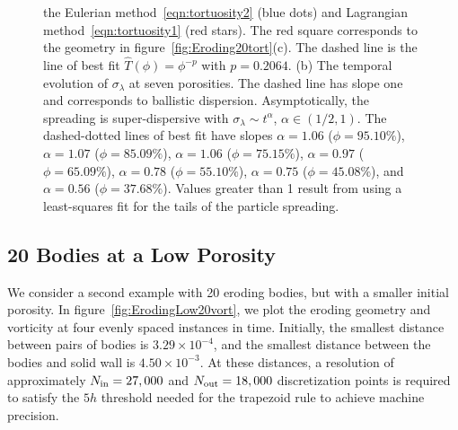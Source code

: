 \documentclass{jfm}
\begin{document}
\begin{figure}
{the Eulerian method~\eqref{eqn:tortuosity2} (blue dots) and Lagrangian
method~\eqref{eqn:tortuosity1} (red stars).  The red square corresponds
to the geometry in figure~\ref{fig:Eroding20tort}(c).  The dashed line
is the line of best fit $\widehat{T}(\phi)=\phi^{-p}$ with $p=0.2064$.
(b) The temporal evolution of $\sigma_\lambda$ at seven porosities.  The
dashed line has slope one and corresponds to ballistic dispersion.
Asymptotically, the spreading is super-dispersive with $\sigma_\lambda
\sim t^\alpha$, $\alpha \in (1/2,1)$.  The dashed-dotted lines of best
fit have slopes $\alpha = 1.06$ ($\phi=95.10\%$), $\alpha = 1.07$
($\phi=85.09\%$), $\alpha = 1.06$ ($\phi=75.15\%$), $\alpha = 0.97$
($\phi=65.09\%$), $\alpha = 0.78$ ($\phi=55.10\%$), $\alpha = 0.75$
($\phi=45.08\%$), and $\alpha = 0.56$ ($\phi=37.68\%$).  Values greater
than 1 result from using a least-squares fit for the tails of the
particle spreading.}
\end{figure}


\subsection{20 Bodies at a Low Porosity}
We consider a second example with 20 eroding bodies, but with a smaller
initial porosity.  In figure~\ref{fig:ErodingLow20vort}, we plot the
eroding geometry and vorticity at four evenly spaced instances in time.
Initially, the smallest distance between pairs of bodies is $3.29 \times
10^{-4}$, and the smallest distance between the bodies and solid wall is
$4.50 \times 10^{-3}$.  At these distances, a resolution of
approximately $N_{\mathrm{in}} = 27,000$ and $N_{\mathrm{out}} = 18,000$ discretization
points is required to satisfy the $5h$ threshold needed for the
trapezoid rule to achieve machine precision.
\end{document}
